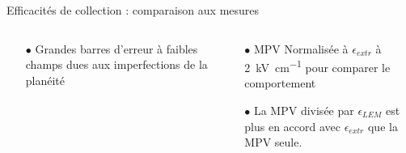 \begin{frame}{Efficacités de collection : comparaison aux mesures}
\begin{scriptsize}
\begin{columns}
\begin{column}{0.5\textwidth}
\begin{itemize}
                        \item[$\bullet$] Grandes barres d'erreur à faibles champs dues aux imperfections de la planéité
                    \end{itemize}
                \end{column}
                \begin{column}{0.5\textwidth}
                    \begin{itemize}
                        \item[$\bullet$] MPV Normalisée à $\epsilon_{extr}$ à \SI{2}{\kilo\volt\per\centi\meter} pour comparer le comportement
                        \item[$\bullet$] La MPV divisée par  $\epsilon_{LEM}$ est plus en accord avec $\epsilon_{extr}$ que la MPV seule.
                    \end{itemize}
                \end{column}
            \end{columns}
        \end{scriptsize}
    \end{frame}

